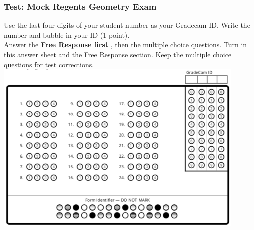 \documentclass[12pt, twoside]{article}
\begin{document}
\subsubsection*{Test: Mock Regents Geometry Exam}

Use the last four digits of your student number as your Gradecam ID. Write the number and bubble in your ID (1 point).\\[0.5cm]

Answer the \textbf{Free Response first }, then the multiple choice questions. Turn in this answer sheet and the Free Response section. Keep the multiple choice questions for test corrections. \\[0.5cm]

\includegraphics[width=0.9\textwidth]{gradecam-24.png}
\end{document}
